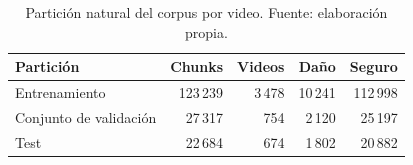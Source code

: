\begin{table}[t]
\centering
\caption{Partición natural del corpus por video. Fuente: elaboración propia.}
\label{tab:splits}
\small
\begin{tabular}{@{}lrrrr@{}}
\toprule
\textbf{Partición} & \textbf{Chunks} & \textbf{Videos} & \textbf{Daño} & \textbf{Seguro} \\
\midrule
Entrenamiento & 123\,239 & 3\,478 & 10\,241 & 112\,998 \\
Conjunto de validación & 27\,317 & 754 & 2\,120 & 25\,197 \\
Test & 22\,684 & 674 & 1\,802 & 20\,882 \\
\bottomrule
\end{tabular}
\end{table}
